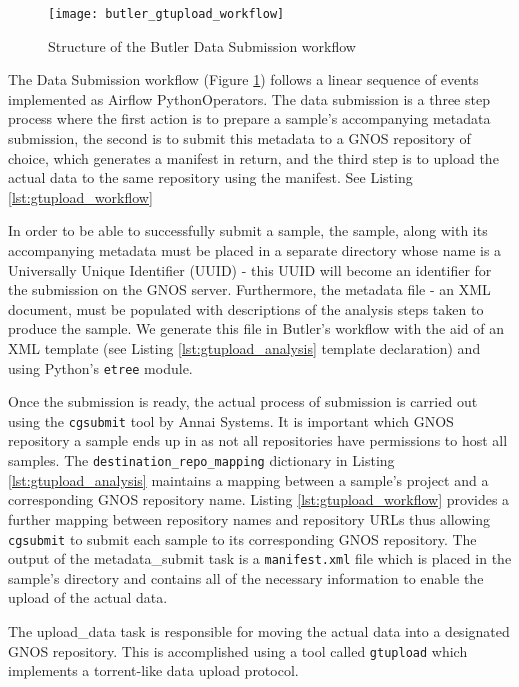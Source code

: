 \begin{figure}[H]
\texttt{[image: butler\_gtupload\_workflow]}
\centering
\caption {Structure of the Butler Data Submission workflow}
\label{fig:butler_gtupload_workflow}
\end{figure}

The Data Submission workflow (Figure \ref{fig:butler_gtupload_workflow}) follows a linear sequence of events implemented as Airflow PythonOperators. The data submission is a three step process where the first action is to prepare a sample's accompanying metadata submission, the second is to submit this metadata to a GNOS repository of choice, which generates a manifest in return, and the third step is to upload the actual data to the same repository using the manifest. See Listing \ref{lst:gtupload_workflow}

In order to be able to successfully submit a sample, the sample, along with its accompanying metadata must be placed in a separate directory whose name is a Universally Unique Identifier (UUID) - this UUID will become an identifier for the submission on the GNOS server. Furthermore, the metadata file - an XML document, must be populated with descriptions of the analysis steps taken to produce the sample. We generate this file in Butler's workflow with the aid of an XML template (see Listing \ref{lst:gtupload_analysis} template declaration) and using Python's \texttt{etree} module.


Once the submission is ready, the actual process of submission is carried out using the \texttt{cgsubmit} tool by Annai Systems. It is important which GNOS repository a sample ends up in as not all repositories have permissions to host all samples. The \texttt{destination_repo_mapping} dictionary in Listing \ref{lst:gtupload_analysis} maintains a mapping between a sample's project and a corresponding GNOS repository name. Listing \ref{lst:gtupload_workflow} provides a further mapping between repository names and repository URLs thus allowing \texttt{cgsubmit} to submit each sample to its corresponding GNOS repository. The output of the metadata\_submit task is a \texttt{manifest.xml} file which is placed in the sample's directory and contains all of the necessary information to enable the upload of the actual data.

The upload\_data task is responsible for moving the actual data into a designated GNOS repository. This is accomplished using a tool called \texttt{gtupload} which implements a torrent-like data upload protocol. 

